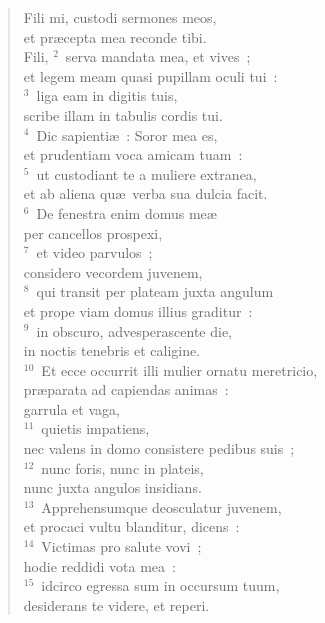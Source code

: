 \begin{flushleft}\begin{verse}\vspace{-19pt}Fili mi, custodi sermones meos,\\ et pr\ae cepta mea reconde tibi.\\ Fili,
${}^{2}$~serva mandata mea, et vives~;\\ et legem meam quasi pupillam oculi tui~:\\
${}^{3}$~liga eam in digitis tuis,\\ scribe illam in tabulis cordis tui.\\
${}^{4}$~Dic sapienti\ae~: Soror mea es,\\ et prudentiam voca amicam tuam~:\\
${}^{5}$~ut custodiant te a muliere extranea,\\ et ab aliena qu\ae\ verba sua dulcia facit.\\
${}^{6}$~De fenestra enim domus me\ae \\ per cancellos prospexi,\\
${}^{7}$~et video parvulos~;\\ considero vecordem juvenem,\\
${}^{8}$~qui transit per plateam juxta angulum\\ et prope viam domus illius graditur~:\\
${}^{9}$~in obscuro, advesperascente die,\\ in noctis tenebris et caligine.\\
${}^{10}$~Et ecce occurrit illi mulier ornatu meretricio,\\ pr\ae parata ad capiendas animas~:\\ garrula et vaga,\\
${}^{11}$~quietis impatiens,\\ nec valens in domo consistere pedibus suis~;\\
${}^{12}$~nunc foris, nunc in plateis,\\ nunc juxta angulos insidians.\\
${}^{13}$~Apprehensumque deosculatur juvenem,\\ et procaci vultu blanditur, dicens~:\\
${}^{14}$~Victimas pro salute vovi~;\\ hodie reddidi vota mea~:\\
${}^{15}$~idcirco egressa sum in occursum tuum,\\ desiderans te videre, et reperi.\\

\end{verse}
\end{flushleft}
